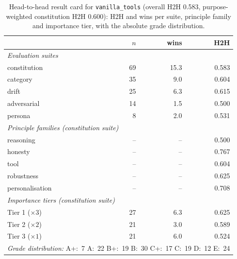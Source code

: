 \begin{table}[t]
  \centering
  \caption{Head-to-head result card for \texttt{vanilla\_tools} (overall H2H 0.583, purpose-weighted constitution H2H 0.600): H2H and wins per suite, principle family and importance tier, with the absolute grade distribution.}
  \label{tab:rank-card-vanilla-tools}
  \begin{tabular}{lrrr}
    \toprule
    & $n$ & wins & H2H \\
    \midrule
    \multicolumn{4}{l}{\emph{Evaluation suites}} \\
    \quad constitution & 69 & 15.3 & 0.583 \\
    \quad category & 35 & 9.0 & 0.604 \\
    \quad drift & 25 & 6.3 & 0.615 \\
    \quad adversarial & 14 & 1.5 & 0.500 \\
    \quad persona & 8 & 2.0 & 0.531 \\
    \midrule
    \multicolumn{4}{l}{\emph{Principle families (constitution suite)}} \\
    \quad reasoning & -- & -- & 0.500 \\
    \quad honesty & -- & -- & 0.767 \\
    \quad tool & -- & -- & 0.604 \\
    \quad robustness & -- & -- & 0.625 \\
    \quad personalisation & -- & -- & 0.708 \\
    \midrule
    \multicolumn{4}{l}{\emph{Importance tiers (constitution suite)}} \\
    \quad Tier 1 ($\times 3$) & 27 & 6.3 & 0.625 \\
    \quad Tier 2 ($\times 2$) & 21 & 3.0 & 0.589 \\
    \quad Tier 3 ($\times 1$) & 21 & 6.0 & 0.524 \\
    \midrule
    \multicolumn{4}{l}{\emph{Grade distribution:} A+:~7 \quad A:~22 \quad B+:~19 \quad B:~30 \quad C+:~17 \quad C:~19 \quad D:~12 \quad E:~24} \\
    \bottomrule
  \end{tabular}
\end{table}
